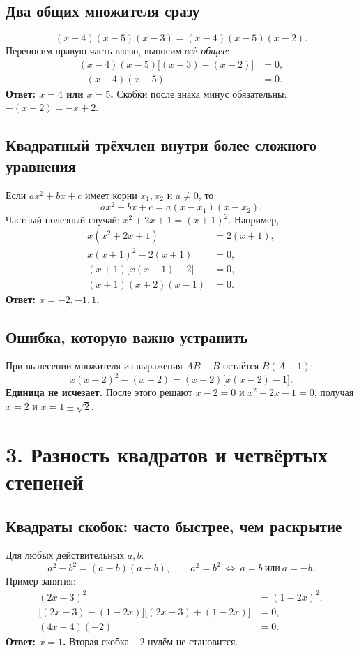 \documentclass[a4paper,12pt]{article}
\newcommand{\sectionrule}{\par\vspace{-0.4em}\noindent{\color{rulegray}\rule{\linewidth}{0.6pt}}\par\vspace{0.25em}}
\newcommand{\key}[1]{\textcolor{darkaccent}{\textbf{#1}}}
\begin{document}
\subsection*{Два общих множителя сразу}
\[
 (x-4)(x-5)(x-3)=(x-4)(x-5)(x-2).
\]
Переносим правую часть влево, выносим \emph{всё общее}:
\[
\begin{aligned}
(x-4)(x-5)\bigl[(x-3)-(x-2)\bigr]&=0,\\
-(x-4)(x-5)&=0.
\end{aligned}
\]
\key{Ответ: \(x=4\) или \(x=5\).} Скобки после знака минус обязательны:
\( -(x-2)=-x+2\).

\subsection*{Квадратный трёхчлен внутри более сложного уравнения}
Если \(ax^2+bx+c\) имеет корни \(x_1,x_2\) и \(a\ne0\), то
\[
 ax^2+bx+c=a(x-x_1)(x-x_2).
\]
Частный полезный случай: \(x^2+2x+1=(x+1)^2\). Например,
\[
\begin{aligned}
x(x^2+2x+1)&=2(x+1),\\
x(x+1)^2-2(x+1)&=0,\\
(x+1)\bigl[x(x+1)-2\bigr]&=0,\\
(x+1)(x+2)(x-1)&=0.
\end{aligned}
\]
\key{Ответ: \(x=-2,-1,1\).}

\subsection*{Ошибка, которую важно устранить}
При вынесении множителя из выражения \(AB-B\) остаётся \(B(A-1)\):
\[
 x(x-2)^2-(x-2)=(x-2)\bigl[x(x-2)-1\bigr].
\]
\key{Единица не исчезает.} После этого решают \(x-2=0\) и \(x^2-2x-1=0\), получая \(x=2\) и \(x=1\pm\sqrt2\).

\clearpage
\section*{3. Разность квадратов и четвёртых степеней}
\sectionrule
\subsection*{Квадраты скобок: часто быстрее, чем раскрытие}
Для любых действительных \(a,b\):
\[
 a^2-b^2=(a-b)(a+b),\qquad
 a^2=b^2\ \Longleftrightarrow\ a=b\ \text{или}\ a=-b.
\]
Пример занятия:
\[
\begin{aligned}
(2x-3)^2&=(1-2x)^2,\\
\bigl[(2x-3)-(1-2x)\bigr]\bigl[(2x-3)+(1-2x)\bigr]&=0,\\
(4x-4)(-2)&=0.
\end{aligned}
\]
\key{Ответ: \(x=1\).} Вторая скобка \(-2\) нулём не становится.
\end{document}
